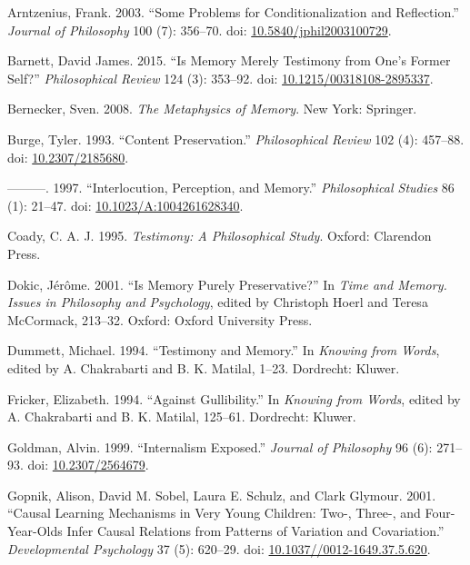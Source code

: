 \documentclass[
  10pt,
  letterpaper,
  DIV=11,
  numbers=noendperiod,
  twoside]{scrartcl}
\newlength{\cslhangindent}
\newenvironment{CSLReferences}[2] %
 {\begin{list}{}{%
  \setlength{\itemindent}{0pt}
  \setlength{\leftmargin}{0pt}
  \setlength{\parsep}{0pt}
  \ifodd #1
   \setlength{\leftmargin}{\cslhangindent}
   \setlength{\itemindent}{-1\cslhangindent}
  \fi
  \setlength{\itemsep}{#2\baselineskip}}}
 {\end{list}}
\begin{document}
\label{refs}
\begin{CSLReferences}{1}{0}
Arntzenius, Frank. 2003. {``Some Problems for Conditionalization and
Reflection.''} \emph{Journal of Philosophy} 100 (7): 356--70. doi:
\href{https://doi.org/10.5840/jphil2003100729}{10.5840/jphil2003100729}.

Barnett, David James. 2015. {``Is Memory Merely Testimony from One's
Former Self?''} \emph{Philosophical Review} 124 (3): 353--92. doi:
\href{https://doi.org/10.1215/00318108-2895337}{10.1215/00318108-2895337}.

Bernecker, Sven. 2008. \emph{The Metaphysics of Memory}. New York:
Springer.

Burge, Tyler. 1993. {``Content Preservation.''} \emph{Philosophical
Review} 102 (4): 457--88. doi:
\href{https://doi.org/10.2307/2185680}{10.2307/2185680}.

---------. 1997. {``Interlocution, Perception, and Memory.''}
\emph{Philosophical Studies} 86 (1): 21--47. doi:
\href{https://doi.org/10.1023/A:1004261628340}{10.1023/A:1004261628340}.

Coady, C. A. J. 1995. \emph{Testimony: A Philosophical Study}. Oxford:
Clarendon Press.

Dokic, Jérôme. 2001. {``Is Memory Purely Preservative?''} In \emph{Time
and Memory. Issues in Philosophy and Psychology}, edited by Christoph
Hoerl and Teresa McCormack, 213--32. Oxford: Oxford University Press.

Dummett, Michael. 1994. {``Testimony and Memory.''} In \emph{{K}nowing
from {W}ords}, edited by A. Chakrabarti and B. K. Matilal, 1--23.
Dordrecht: {K}luwer.

Fricker, Elizabeth. 1994. {``{A}gainst {G}ullibility.''} In
\emph{{K}nowing from {W}ords}, edited by A. Chakrabarti and B. K.
Matilal, 125--61. Dordrecht: {K}luwer.

Goldman, Alvin. 1999. {``Internalism Exposed.''} \emph{Journal of
Philosophy} 96 (6): 271--93. doi:
\href{https://doi.org/10.2307/2564679}{10.2307/2564679}.

Gopnik, Alison, David M. Sobel, Laura E. Schulz, and Clark Glymour.
2001. {``Causal Learning Mechanisms in Very Young Children: Two-,
Three-, and Four-Year-Olds Infer Causal Relations from Patterns of
Variation and Covariation.''} \emph{Developmental Psychology} 37 (5):
620--29. doi:
\href{https://doi.org/10.1037//0012-1649.37.5.620}{10.1037//0012-1649.37.5.620}.


\end{CSLReferences}
\end{document}
